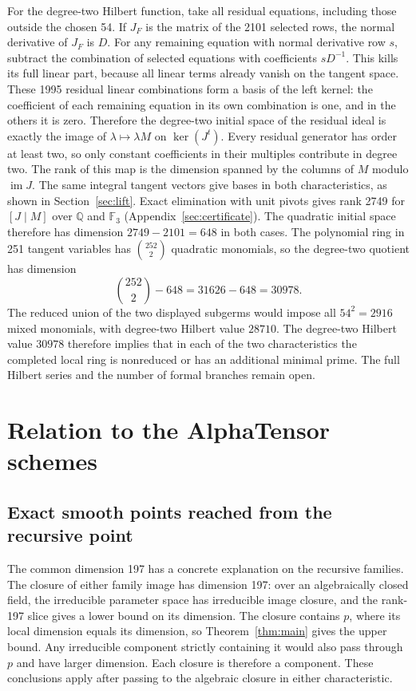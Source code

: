 \documentclass[11pt]{amsart}
\newcommand{\F}{\mathbb F}
\newcommand{\Q}{\mathbb Q}
\newcommand{\im}{\operatorname{im}}
\begin{document}
For the degree-two Hilbert function, take all residual equations,
including those outside the chosen 54. If $J_F$ is the matrix of
the 2101 selected rows, the normal derivative of $J_F$ is $D$.
For any remaining equation with normal derivative row $s$, subtract
the combination of selected equations with coefficients $sD^{-1}$.
This kills its full linear part, because all linear terms already
vanish on the tangent space. These 1995 residual linear combinations
form a basis of the left kernel: the coefficient of each remaining
equation in its own combination is one, and in the others it is zero.
Therefore the degree-two initial space of the residual ideal is
exactly the image of $\lambda\mapsto\lambda M$ on $\ker(J^t)$.
Every residual generator has order at least two, so only constant
coefficients in their multiples contribute in degree two.
The rank of this map is the dimension spanned by the columns
of $M$ modulo $\im J$. The same integral tangent vectors give
bases in both characteristics, as shown in Section~\ref{sec:lift}.
Exact elimination with unit pivots gives rank 2749 for
$[J\mid M]$ over $\Q$ and $\F_3$
(Appendix~\ref{sec:certificate}). The quadratic initial space
therefore has dimension $2749-2101=648$ in both cases. The
polynomial ring in 251 tangent variables has $\binom{252}{2}$
quadratic monomials, so the degree-two quotient has dimension
\[
 \binom{252}{2}-648=31626-648=30978.
\]
The reduced union of the two displayed subgerms would impose all
$54^2=2916$ mixed monomials, with degree-two Hilbert value $28710$.
The degree-two Hilbert value $30978$ therefore implies that in
each of the two characteristics the completed local ring is
nonreduced or has an additional minimal prime. The full Hilbert
series and the number of formal branches remain open.

\section{Relation to the AlphaTensor schemes}\label{sec:alphatensor}

\subsection{Exact smooth points reached from the recursive point}

The common dimension 197 has a concrete explanation on the recursive
families. The closure of either family image has dimension 197:
over an algebraically closed field, the irreducible parameter space
has irreducible image closure, and the rank-197 slice gives a lower
bound on its dimension. The closure contains $p$, where its local
dimension equals its dimension, so Theorem~\ref{thm:main} gives
the upper bound. Any irreducible component strictly containing
it would also pass through $p$ and have larger dimension. Each
closure is therefore a component. These conclusions apply after
passing to the algebraic closure in either characteristic.
\end{document}
